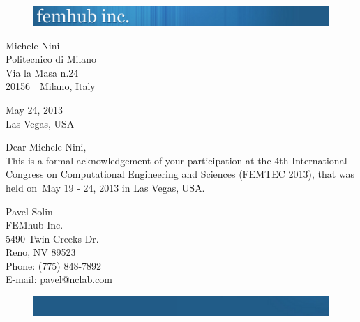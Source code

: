 \documentclass[12pt]{article}
\makeatletter
\newcommand{\certificate}[6]
{
	\begin{figure}[h!]
		\includegraphics[width=\textwidth]{femhub_logo.png}
	\end{figure}

	\vspace{50pt}
	
	\noindent
	{#1}\\
	{#2}\\
	{#3}\\
	{#4}\ \ {#5}, {#6}\\
	\vspace{50pt}
	
	\begin{flushright}
		May 24, 2013\\
		Las Vegas, USA
	\end{flushright}
	\vspace{30pt}
	
	\noindent Dear {#1},\\

	This is a formal acknowledgement of your participation at the 4th International Congress on Computational Engineering and Sciences (FEMTEC 2013), that was held on~May 19 - 24, 2013 in Las Vegas, USA.
	\vspace{100pt}

	\noindent
	Pavel Solin\\
	FEMhub Inc.\\
	5490 Twin Creeks Dr.\\
	Reno, NV 89523\\
	Phone: (775) 848-7892\\
	E-mail: pavel@nclab.com\\
	
	\begin{figure}[h!]
		\includegraphics[width=\textwidth]{femhub_footer.png}
	\end{figure}
	\newpage
}
\makeatother
\begin{document}
\pagestyle{empty}

\certificate{Michele Nini}{Politecnico di Milano}{Via la Masa n.24}{20156}{Milano}{Italy}
\end{document}
